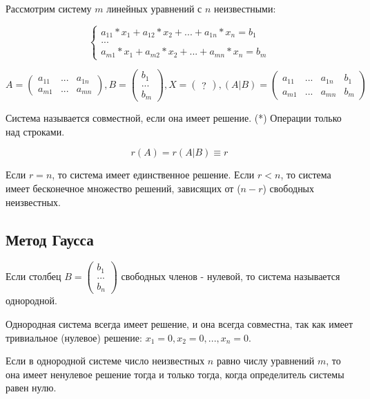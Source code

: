 \documentclass{article}
\begin{document}
Рассмотрим систему $m$ линейных уравнений с $n$ неизвестными:

\begin{equation}
    \begin{cases}
        a_{11} * x_1 + a_{12} * x_2 + ... + a_{1n} * x_n = b_1 \\
        ... \\
        a_{m1} * x_1 + a_{m2} * x_2 + ... + a_{mn} * x_n = b_m
    \end{cases}
\end{equation}

$A = \begin{pmatrix}
    a_{11} & ... & a_{1n} \\ 
    a_{m1} & ... & a_{m n}
\end{pmatrix}, B = \begin{pmatrix}
    b_1 \\
    ... \\
    b_m
\end{pmatrix}, X = \begin{pmatrix}
    ?
\end{pmatrix}, (A|B) = \begin{pmatrix}
    a_{11} & ... & a_{1 n} & b_1 \\
    a_{m1} & ... & a_{m n} & b_m
\end{pmatrix}$

Система называется совместной, если она имеет решение. (*) Операции только над строками.

$$r(A) = r(A|B) \equiv r$$

Если $r = n$, то система имеет единственное решение. Если $r < n$, то система имеет бесконечное множество решений, зависящих от ($n - r$) свободных неизвестных.

\subsection{Метод Гаусса}

Если столбец $B = \begin{pmatrix} b_1 \\ ... \\ b_n \end{pmatrix}$ свободных членов - нулевой, то система называется однородной.

Однородная система всегда имеет решение, и она всегда совместна, так как имеет тривиальное (нулевое) решение: $x_1 = 0, x_2 = 0, ..., x_n = 0$.

Если в однородной системе число неизвестных $n$ равно числу уравнений $m$, то она имеет ненулевое решение тогда и только тогда, когда определитель системы равен нулю.
\end{document}
